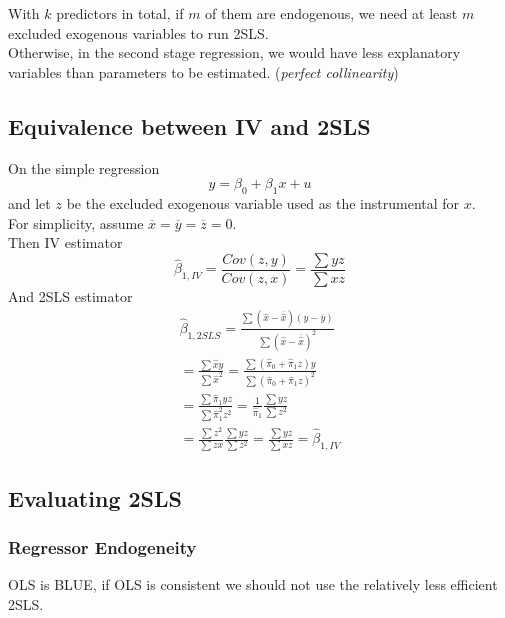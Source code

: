 \documentclass[]{article}
\begin{document}
		\begin{remark}
			With $k$ predictors in total, if $m$ of them are endogenous, we need at least $m$ excluded exogenous variables to run 2SLS.\\
			Otherwise, in the second stage regression, we would have less explanatory variables than parameters to be estimated. (\emph{perfect collinearity})
		\end{remark}
		
		\subsection{Equivalence between IV and 2SLS}
			\par On the simple regression 
			\[
				y = \beta_0 + \beta_1 x + u
			\]
			and let $z$ be the excluded exogenous variable used as the instrumental for $x$. \\
			For simplicity, assume $\overline{x} = \overline{y} = \overline{z} = 0$. \\
			Then IV estimator 
			\[
				\hat{\beta}_{1, IV} = \frac{Cov(z,y)}{Cov(z,x)} = \frac{\sum{yz}}{\sum{xz}}
			\]
			And 2SLS estimator
			\begin{gather*}
				\hat{\beta}_{1,2SLS} = \frac{\sum (\hat{x} - \overline{\hat{x}}) (y - \overline{y})}{\sum (\hat{x} - \overline{\hat{x}})^2} \\
				= \frac{\sum \hat{x} y}{\sum \hat{x}^2}
				= \frac{\sum (\hat{\pi}_0 + \hat{\pi}_1 z) y}{\sum (\hat{\pi}_0 + \hat{\pi}_1 z)^2} \\
				= \frac{\sum \hat{\pi}_1 y z}{\sum \hat{\pi}_1^2 z^2}
				= \frac{1}{\hat{\pi}_1} \frac{\sum yz}{\sum z^2} \\
				= \frac{\sum z^2}{\sum zx} \frac{\sum yz}{\sum z^2} = \frac{\sum yz}{\sum xz} = \hat{\beta}_{1, IV}
			\end{gather*}
	\subsection{Evaluating 2SLS}
		\subsubsection{Regressor Endogeneity}
			\par OLS is BLUE, if OLS is consistent we should not use the relatively less efficient 2SLS.
\end{document}
